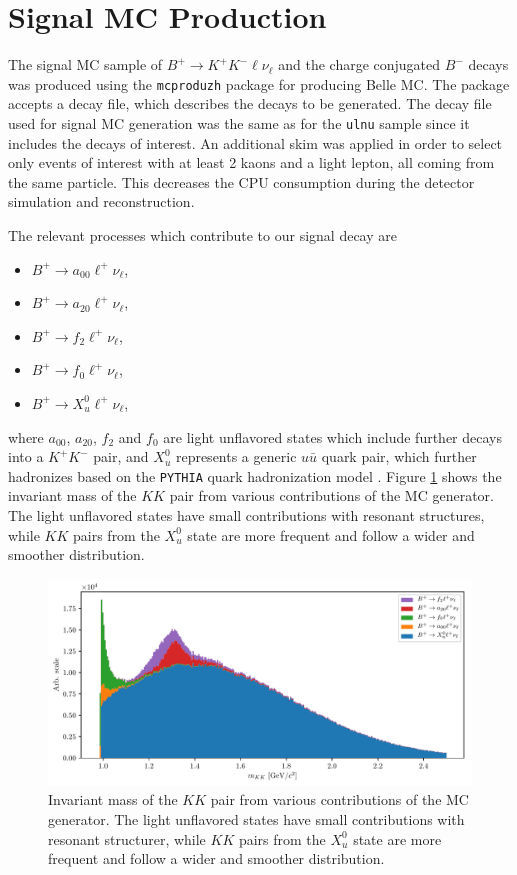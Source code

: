 \section{Signal MC Production}

The signal MC sample of $B^+ \to K^+ K^- \ell \nu_\ell$ and the charge conjugated $B^-$ decays was produced using the \texttt{mcproduzh} package for producing Belle MC. The package accepts a decay file, which describes the decays to be generated. The decay file used for signal MC generation was the same as for the \texttt{ulnu} sample since it includes the decays of interest. An additional skim was applied in order to select only events of interest with at least 2 kaons and a light lepton, all coming from the same particle. This decreases the CPU consumption during the detector simulation and reconstruction.

The relevant processes which contribute to our signal decay are
\begin{itemize}
	\item $B^+ \to a_{00} \ell^+ \nu_\ell$,
	\item $B^+ \to a_{20} \ell^+ \nu_\ell$,
	\item $B^+ \to f_{2} \ell^+ \nu_\ell$,
	\item $B^+ \to f_{0} \ell^+ \nu_\ell$,
	\item $B^+ \to X_{u}^0 \ell^+ \nu_\ell$,
\end{itemize}
where $a_{00}$, $a_{20}$, $f_{2}$ and $f_{0}$ are light unflavored states which include further decays into a $K^+K^-$ pair, and $X_u^0$ represents a generic $u \bar u$ quark pair, which further hadronizes based on the \texttt{PYTHIA} quark hadronization model \cite{sjostrand2006pythia}. Figure \ref{fig:KKsrc} shows the invariant mass of the $KK$ pair from various contributions of the MC generator. The light unflavored states have small contributions with resonant structures, while $KK$ pairs from the $X_u^0$ state are more frequent and follow a wider and smoother distribution.

\begin{figure}[!htb]
	\centering
	\includegraphics[width=\linewidth]{fig/KKlnu_src}
	\captionsetup{width=.8\linewidth}
	\caption{Invariant mass of the $KK$ pair from various contributions of the MC generator. The light unflavored states have small contributions with resonant structurer, while $KK$ pairs from the $X_u^0$ state are more frequent and follow a wider and smoother distribution.}
	\label{fig:KKsrc}
\end{figure}

